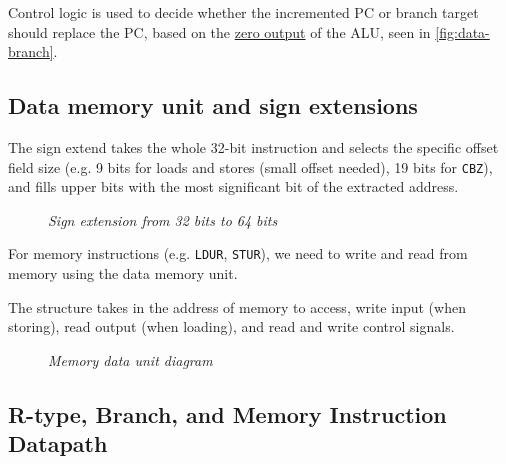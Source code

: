 \documentclass[11pt]{article}
\begin{document}
Control logic is used to decide whether the incremented PC or branch target should replace the PC, based on the \hyperref[jmp:zero-flag]{zero output} of the ALU, seen in \autoref{fig:data-branch}.


\subsection*{Data memory unit and sign extensions}

The sign extend takes the whole 32-bit instruction and selects the specific offset field size (e.g. 9 bits for loads and stores (small offset needed), 19 bits for \texttt{CBZ}), and fills upper bits with the most significant bit of the extracted address.

\begin{figure}[htbp]
    \centering
    \caption{\textit{Sign extension from 32 bits to 64 bits}}
\end{figure}


For memory instructions (e.g. \texttt{LDUR}, \texttt{STUR}), we need to write and read from memory using the data memory unit.

The structure takes in the address of memory to access, write input (when storing), read output (when loading), and read and write control signals.

\begin{figure}[htbp]
    \centering
    \caption{\textit{Memory data unit diagram}}
\end{figure}

\subsection*{R-type, Branch, and Memory Instruction Datapath}
\end{document}
